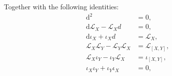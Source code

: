 \documentclass[a4paper,12pt]{scrartcl}
\providecommand{\lie}{\mathcal{L}}
\providecommand{\dext}{\textrm{d}}
\begin{document}
\begin{landscape}
\begin{minipage}{0.45 \linewidth}
{{				Together with the following identities:
				\begin{align}
					\dext^2 &= 0, \label{cartfirst}\\
					\dext \lie_X - \lie_X d &= 0, \\
					\dext \iota_X + \iota_X d &= \lie_X, \label{magic}\\
					\lie_X \lie_Y - \lie_Y \lie_X &= \lie_{[X,Y]}, \\
					\lie_X \iota_Y - \iota_Y \lie_X &= \iota_{[X,Y]},\\
					\iota_X \iota_Y + \iota_Y \iota_X &= 0, \label{cartlast}
				\end{align}
		  }
		}

	\end{minipage}
	\hspace{1cm}
	\begin{minipage}{0.45 \linewidth}
		\vfill

	\end{minipage}
	


    
  \end{landscape}
\end{document}
